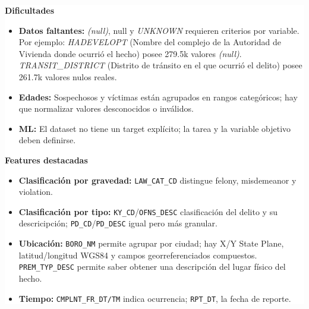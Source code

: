 \documentclass[a4paper,11pt]{article}
\begin{document}
	\begin{minipage}[t]{0.48\textwidth}
		\vspace{0pt}
		
		\noindent
		\colorbox{primary}{}
		\vspace{0.1cm}
		
		\noindent
		\colorbox{white}{\parbox{\dimexpr\linewidth-2\fboxsep\relax}{
				\vspace{0.08cm}
				\scriptsize
				\setlength{\leftmargini}{1.1em}
				
				\textcolor{primary}{\textbf{Dificultades}}\par
				\begin{itemize}
					\setlength{\itemsep}{0.04cm}
					\setlength{\topsep}{0.04cm}
					\setlength{\parsep}{0pt}
					\item \textbf{Datos faltantes:} \textit{(null)}, null y \textit{UNKNOWN} requieren criterios por variable. Por ejemplo:
					\subitem \textit{HADEVELOPT} (Nombre del complejo de la Autoridad de Vivienda donde ocurrió el hecho) posee 279.5k valores \textit{(null)}.
					\subitem \textit{TRANSIT\_DISTRICT} (Distrito de tránsito en el que ocurrió el delito) posee 261.7k valores nulos reales.
					\item \textbf{Edades:} Sospechosos y víctimas están agrupados en rangos categóricos; hay que normalizar valores desconocidos o inválidos.
					\item \textbf{ML:} El dataset no tiene un target explícito; la tarea y la variable objetivo deben definirse.
				\end{itemize}
				
				\vspace{0.3cm}
				\textcolor{primary}{\textbf{Features destacadas}}\par
				\begin{itemize}
					\setlength{\itemsep}{0.04cm}
					\setlength{\topsep}{0.04cm}
					\setlength{\parsep}{0pt}
					\item \textbf{Clasificación por gravedad:} \texttt{LAW\_CAT\_CD} distingue felony, misdemeanor y violation.
					\item \textbf{Clasificación por tipo:} \texttt{KY\_CD}/\texttt{OFNS\_DESC} clasificación del delito y su descricipción; \texttt{PD\_CD}/\texttt{PD\_DESC} igual pero más granular.
					\item \textbf{Ubicación:} \texttt{BORO\_NM} permite agrupar por ciudad; hay X/Y State Plane, latitud/longitud WGS84 y campos georreferenciados compuestos. \texttt{PREM\_TYP\_DESC} permite saber obtener una descripción del lugar físico del hecho.
					\item \textbf{Tiempo:} \texttt{CMPLNT\_FR\_DT/TM} indica ocurrencia; \texttt{RPT\_DT}, la fecha de reporte.
				\end{itemize}
				\vspace{0.04cm}
		}}
		

\end{minipage}
\end{document}
